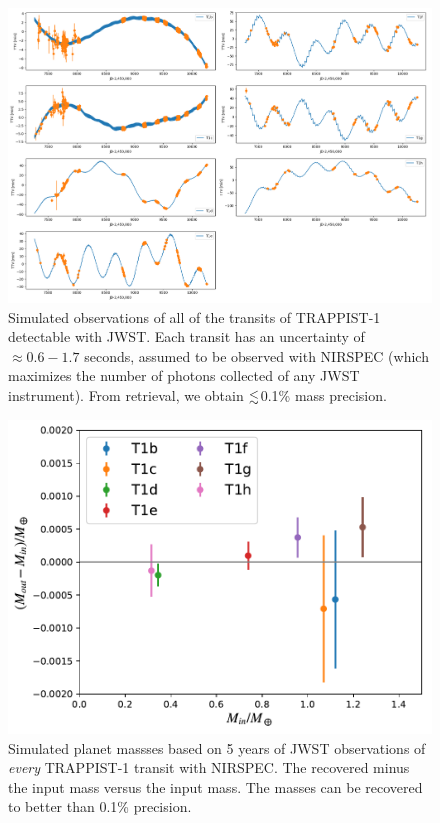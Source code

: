 \documentclass[twocolumn]{aastex63}
\begin{document}
\begin{figure}
    \centering
    \includegraphics[width=\hsize]{figures/T1_JWST_all_transits_tight.png}
    \caption{Simulated observations of all of the transits of TRAPPIST-1
    detectable with JWST.  Each transit has an
    uncertainty of ${\approx} 0.6-1.7   $ seconds, assumed to be observed with
    NIRSPEC (which maximizes the number of photons collected of any JWST
    instrument).  From retrieval, we obtain
    ${\lesssim}$0.1\% mass precision.}
    \label{fig:JWST_all_the_transits}
\end{figure}

\begin{figure}
    \centering
    \includegraphics[width=\hsize]{figures/Recovered_masses_JWST_5yr_all_transits_NIRSPEC.pdf}
    \caption{Simulated planet massses based on 5 years of JWST observations
    of \emph{every} TRAPPIST-1 transit with NIRSPEC.  The recovered minus
    the input mass versus the input mass.  The masses can be recovered to
    better than 0.1\% precision.}
    \label{fig:JWST_all_mass}
\end{figure}
\end{document}
